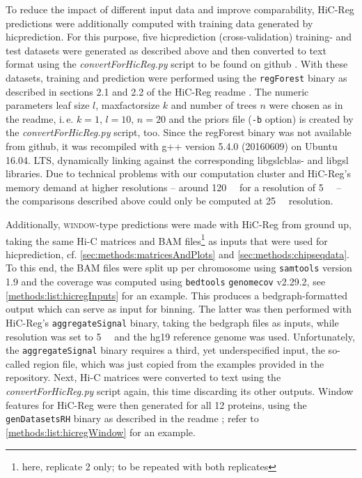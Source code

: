 To reduce the impact of different input data and improve comparability, 
HiC-Reg predictions were additionally computed with training data 
generated by hicprediction.
For this purpose, five hicprediction (cross-validation) training- and test datasets were generated as described above and then 
converted to text format using the \emph{convertForHicReg.py} script to be found on github \cite{Krauth2020}.
With these datasets, training and prediction were performed using the \texttt{regForest} binary as 
described in sections 2.1 and 2.2 of the HiC-Reg readme \cite{Roy2020}.
The numeric parameters leaf size $l$, maxfactorsize $k$ and number of trees $n$ were
chosen as in the readme, i.\,e. $k=1$, $l=10$, $n=20$ and 
the priors file (\texttt{-b} option) is created by the \emph{convertForHicReg.py} script, too.
Since the regForest binary was not available from github, it was recompiled
with g++ version 5.4.0 (20160609) on Ubuntu 16.04. LTS, dynamically linking against the
corresponding libgslcblas- and libgsl libraries.
Due to technical problems with our computation cluster and HiC-Reg's memory demand at higher resolutions 
-- around \SI{120}{\giga\byte} for a resolution of \SI{5}{\kilo\bp} -- 
the comparisons described above could only be computed at \SI{25}{\kilo\bp} resolution.

Additionally, \textsc{window}-type predictions were made with HiC-Reg from ground up,
taking the same Hi-C matrices and BAM files\footnote{here, replicate 2 only; to be repeated with both replicates} 
as inputs that were used for hicprediction, 
cf. \autoref{sec:methods:matricesAndPlots} and \ref{sec:methods:chipseqdata}.
To this end, the BAM files were split up 
per chromosome using \texttt{samtools} version 1.9
and the coverage was computed using \texttt{bedtools} \texttt{genomecov} v2.29.2, 
see \autoref{methods:list:hicregInputs} for an example. 
This produces a bedgraph-formatted output which can serve as input for binning.
The latter was then performed with HiC-Reg's \texttt{aggregateSignal} binary, 
taking the bedgraph files as inputs, while resolution was set to \SI{5}{\kilo\bp} and the hg19 reference genome was used. 
Unfortunately, the \texttt{aggregateSignal} binary requires a third, yet underspecified input, 
the so-called region file, which was just copied from the examples provided in the repository.
Next, Hi-C matrices were converted to text using the \emph{convertForHicReg.py} script again, this time discarding its other outputs.
Window features for HiC-Reg were then generated for all 12 proteins,
using the \texttt{genDatasetsRH} binary as described in the readme \cite{Roy2020}; refer to \autoref{methods:list:hicregWindow} for an example.

